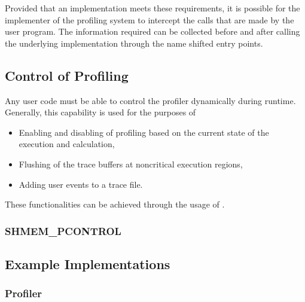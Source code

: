 Provided that an \openshmem implementation meets these requirements,
it is possible for the implementer of the profiling system
to intercept the \openshmem calls that are made by the user
program. The information required can be collected before and after
calling the underlying \openshmem implementation through the name
shifted entry points.

\subsection{Control of Profiling}
\label{sec:pshmem_control_profile}
Any user code must be able to control the profiler dynamically
during runtime. Generally, this capability is used for the
purposes of

\begin{itemize}
\item Enabling and disabling of profiling based on the current
state of the execution and calculation,
\item Flushing of the trace buffers at noncritical execution
regions,
\item Adding user events to a trace file.
\end{itemize}

These functionalities can be achieved through the usage of
.

\subsubsection{\textbf{SHMEM\_PCONTROL}}\label{subsec:shmem_pcontrol}




\subsection{Example Implementations}
\label{sec:pshmem_example_implementations}

\subsubsection{Profiler}
\label{sec:pshmem_example_profiler}


